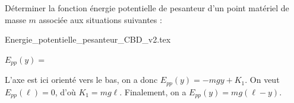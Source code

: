 \finEntrainement




\hauteurLargeurCadreReponse		{7mm}{4cm}
\initialisationEntrainement

Déterminer la fonction énergie potentielle de pesanteur d'un point matériel de masse $m$ associée aux situations suivantes :
\begin{center}
{Energie_potentielle_pesanteur_CBD_v2.tex}
\end{center}

\debutEntrainement


\begin{enonce}
$E_{pp}(y)=$
\end{enonce}


\begin{corrige}
L'axe est ici orienté vers le bas, on a donc $E_{pp}(y)=-mgy+ K_1$. On veut $E_{pp}(\ell)=0$, d'où $K_1=mg\ell$. Finalement, on a 
$E_{pp}(y)=mg(\ell-y)$.
\end{corrige}





